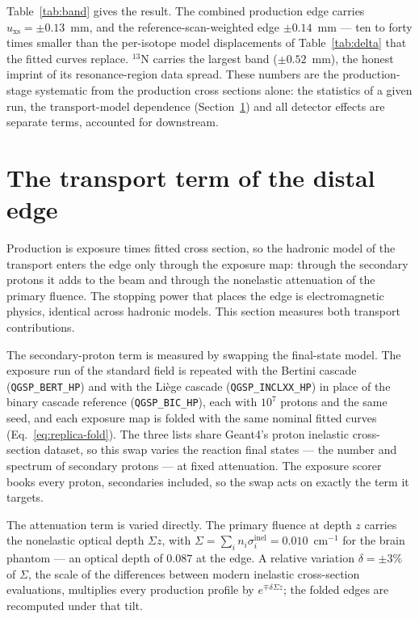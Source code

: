 \documentclass[11pt]{article}
\begin{document}
Table~\ref{tab:band} gives the result.  The combined production edge
carries $u_{\mathrm{xs}} = \pm0.13$~mm, and the reference-scan-weighted
edge $\pm0.14$~mm --- ten to forty times smaller than the per-isotope model
displacements of Table~\ref{tab:delta} that the fitted curves replace.
$^{13}$N carries the largest band ($\pm0.52$~mm), the honest imprint of its
resonance-region data spread.  These numbers are the production-stage
systematic from the production cross sections alone: the statistics of a
given run, the transport-model dependence
(Section~\ref{sec:transport-envelope}) and all detector effects are
separate terms, accounted for downstream.

\section{The transport term of the distal edge}
\label{sec:transport-envelope}

Production is exposure times fitted cross section, so the hadronic model of
the transport enters the edge only through the exposure map: through the
secondary protons it adds to the beam and through the nonelastic attenuation
of the primary fluence.  The stopping power that places the edge is
electromagnetic physics, identical across hadronic models.  This section
measures both transport contributions.

The secondary-proton term is measured by swapping the final-state model.
The exposure run of the standard field is repeated with the Bertini cascade
(\texttt{QGSP\_BERT\_HP}) and with the Li\`ege cascade
(\texttt{QGSP\_INCLXX\_HP}) in place of the binary cascade reference
(\texttt{QGSP\_BIC\_HP}), each with $10^{7}$ protons and the same seed, and
each exposure map is folded with the same nominal fitted curves
(Eq.~\eqref{eq:replica-fold}).  The three lists share Geant4's proton
inelastic cross-section dataset, so this swap varies the reaction final
states --- the number and spectrum of secondary protons --- at fixed
attenuation.  The exposure scorer books every proton, secondaries included,
so the swap acts on exactly the term it targets.

The attenuation term is varied directly.  The primary fluence at depth $z$
carries the nonelastic optical depth $\Sigma z$, with
$\Sigma = \sum_i n_i\sigma^{\mathrm{inel}}_i = 0.010$~cm$^{-1}$ for the
brain phantom --- an optical depth of $0.087$ at the edge.  A relative
variation $\delta = \pm3\%$ of $\Sigma$, the scale of the differences
between modern inelastic cross-section evaluations, multiplies every
production profile by $e^{\mp\delta\Sigma z}$; the folded edges are
recomputed under that tilt.
\end{document}
